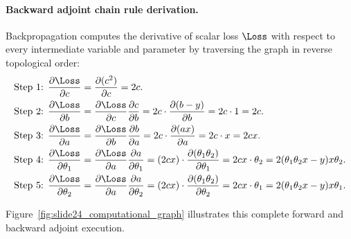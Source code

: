 \documentclass[../../main.tex]{subfiles}
\begin{document}
\paragraph{Backward adjoint chain rule derivation.}
Backpropagation computes the derivative of scalar loss $\Loss$ with respect to every intermediate variable and parameter by traversing the graph in reverse topological order:
\begin{align}
\text{Step 1: } \frac{\partial \Loss}{\partial c} &= \frac{\partial (c^2)}{\partial c} = 2c. \label{eq:bwd_c} \\
\text{Step 2: } \frac{\partial \Loss}{\partial b} &= \frac{\partial \Loss}{\partial c} \frac{\partial c}{\partial b} = 2c \cdot \frac{\partial (b - y)}{\partial b} = 2c \cdot 1 = 2c. \label{eq:bwd_b} \\
\text{Step 3: } \frac{\partial \Loss}{\partial a} &= \frac{\partial \Loss}{\partial b} \frac{\partial b}{\partial a} = 2c \cdot \frac{\partial (a x)}{\partial a} = 2c \cdot x = 2cx. \label{eq:bwd_a} \\
\text{Step 4: } \frac{\partial \Loss}{\partial \theta_1} &= \frac{\partial \Loss}{\partial a} \frac{\partial a}{\partial \theta_1} = (2cx) \cdot \frac{\partial (\theta_1 \theta_2)}{\partial \theta_1} = 2cx \cdot \theta_2 = 2(\theta_1 \theta_2 x - y) x \theta_2. \label{eq:bwd_theta1} \\
\text{Step 5: } \frac{\partial \Loss}{\partial \theta_2} &= \frac{\partial \Loss}{\partial a} \frac{\partial a}{\partial \theta_2} = (2cx) \cdot \frac{\partial (\theta_1 \theta_2)}{\partial \theta_2} = 2cx \cdot \theta_1 = 2(\theta_1 \theta_2 x - y) x \theta_1. \label{eq:bwd_theta2}
\end{align}

Figure~\ref{fig:slide24_computational_graph} illustrates this complete forward and backward adjoint execution.
\end{document}
